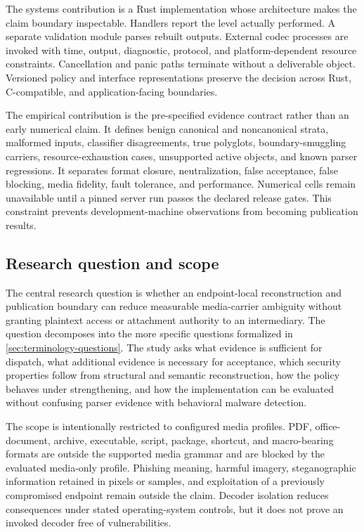 The systems contribution is a Rust implementation whose architecture makes
the claim boundary inspectable. Handlers report the level actually performed.
A separate validation module parses rebuilt outputs. External codec processes
are invoked with time, output, diagnostic, protocol, and platform-dependent
resource constraints. Cancellation and panic paths terminate without a
deliverable object. Versioned policy and interface representations preserve the
decision across Rust, C-compatible, and application-facing boundaries.

The empirical contribution is the pre-specified evidence contract rather than
an early numerical claim. It defines benign canonical and noncanonical strata,
malformed inputs, classifier disagreements, true polyglots, boundary-smuggling
carriers, resource-exhaustion cases, unsupported active objects, and known
parser regressions. It separates format closure, neutralization, false
acceptance, false blocking, media fidelity, fault tolerance, and performance.
Numerical cells remain unavailable until a pinned server run passes the
declared release gates. This constraint prevents development-machine
observations from becoming publication results.

\subsection{Research question and scope}

The central research question is whether an endpoint-local reconstruction and
publication boundary can reduce measurable media-carrier ambiguity without
granting plaintext access or attachment authority to an intermediary. The
question decomposes into the more specific questions formalized in
\cref{sec:terminology-questions}. The study asks what evidence is sufficient
for dispatch, what additional evidence is necessary for acceptance, which
security properties follow from structural and semantic reconstruction, how
the policy behaves under strengthening, and how the implementation can be
evaluated without confusing parser evidence with behavioral malware detection.

The scope is intentionally restricted to configured media profiles. PDF,
office-document, archive, executable, script, package, shortcut, and
macro-bearing formats are outside the supported media grammar and are blocked
by the evaluated media-only profile. Phishing meaning, harmful imagery,
steganographic information retained in pixels or samples, and exploitation of
a previously compromised endpoint remain outside the claim. Decoder isolation
reduces consequences under stated operating-system controls, but it does not
prove an invoked decoder free of vulnerabilities.

